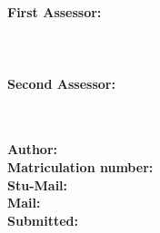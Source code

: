 \begin{titlepage}
\begin{center}
        \makeatother
        {\small \maybehref{\thesislicenseURL}{\thesislicenseText}}\\[0.03in]
        {\small \maybehref{\thesisgiturl}{\thesisgitlabel}}\\[0.03in]
        \pagebreak
        \begin{center}
            \textbf{First Assessor:} \\[0.2in]
            {\large \firstsupervisorname} \\[0.2in]
            {\large \firstsupervisortitle} \\[0.2in]
            {\large \firstsupervisordepartment} \\[0.5in]
            \textbf{Second Assessor:} \\[0.2in]
            {\large \secondsupervisorname} \\[0.2in]
            {\large \secondsupervisortitle} \\[0.2in]
            {\large \secondsupervisordepartment}
        \end{center}
        \begin{flushleft}
            \vspace{9.5cm}
            \makeatletter
            \textbf{Author:} \textnormal{\mdseries \thesisauthor} \\[0.1in]
            \makeatother
            \textbf{Matriculation number:} \textnormal{\mdseries \stunumber} \\[0.1in]
            \textbf{Stu-Mail:} \textnormal{\mdseries \stuemail} \\[0.1in]
            \textbf{Mail:} \textnormal{\mdseries \privatemail} \\[0.1in]
            \textbf{Submitted:} \textnormal{\mdseries \submissiondate} \\[0.1in]
        \end{flushleft}
    \end{center}
\end{titlepage}